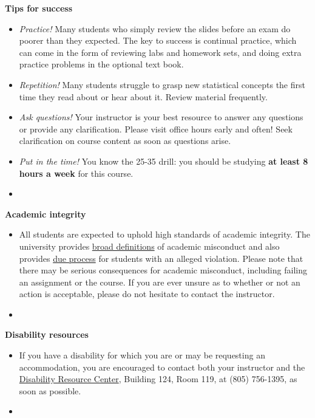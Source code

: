 \documentclass[letterpaper,12pt]{report}
\begin{document}
\textbf{Tips for success}
\begin{itemize}
\item \emph{Practice!}  Many students who simply review the slides before an exam do poorer than they expected. The key to success is continual practice, which can come in the form of reviewing labs and homework sets, and doing extra practice problems in the optional text book.
\item \emph{Repetition!}  Many students struggle to grasp new statistical concepts the first time they read about or hear about it.  Review material frequently.
\item \emph{Ask questions!} Your instructor is your best resource to answer any questions or provide any clarification. Please visit office hours early and often!  Seek clarification on course content as soon as questions arise.
\item \emph{Put in the time!}  You know the 25-35 drill: you should be studying \textbf{at least 8 hours a week} for this course.
\item[]
\end{itemize}

\textbf{Academic integrity}
\begin{itemize}
\item[]
All students are expected to uphold high standards of academic integrity. The university provides \href{http://www.academicprograms.calpoly.edu/content/academicpolicies/Cheating}{broad definitions} of academic misconduct and also provides \href{http://www.osrr.calpoly.edu/process}{due process} for students with an alleged violation.  Please note that there may be serious consequences for academic misconduct, including failing an assignment or the course. If you are ever unsure as to whether or not an action is acceptable, please do not hesitate to contact the instructor.
\item[]
\end{itemize}

\textbf{Disability resources}
\begin{itemize}
\item[]
If you have a disability for which you are or may be requesting an accommodation, you are encouraged to contact both your instructor and the \href{http://drc.calpoly.edu/}{Disability Resource Center}, Building 124, Room 119, at (805) 756-1395, as soon as possible.
\item[]
\end{itemize}
\end{document}
